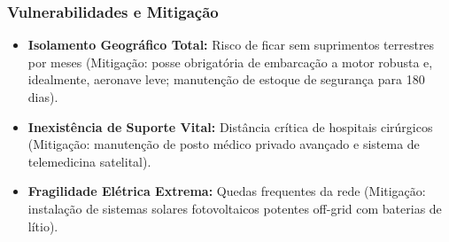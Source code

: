 \subsubsection{Vulnerabilidades e
Mitigação}

\begin{itemize}
\tightlist
\item
  \textbf{Isolamento Geográfico Total:} Risco de ficar sem suprimentos
  terrestres por meses (Mitigação: posse obrigatória de embarcação a
  motor robusta e, idealmente, aeronave leve; manutenção de estoque de
  segurança para 180 dias).
\item
  \textbf{Inexistência de Suporte Vital:} Distância crítica de hospitais
  cirúrgicos (Mitigação: manutenção de posto médico privado avançado e
  sistema de telemedicina satelital).
\item
  \textbf{Fragilidade Elétrica Extrema:} Quedas frequentes da rede
  (Mitigação: instalação de sistemas solares fotovoltaicos potentes
  off-grid com baterias de lítio).
\end{itemize}

